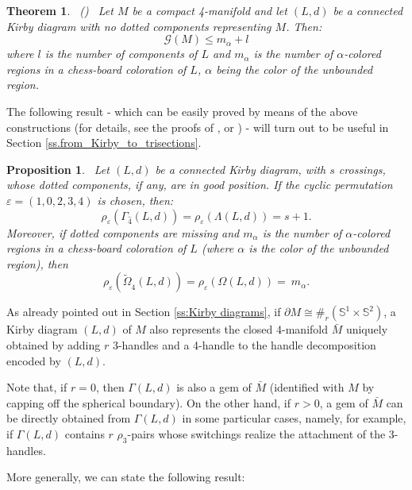 \documentclass[12pt,a4paper]{article}
\newtheorem{theorem}[lemma]{Theorem}
\newtheorem{proposition}[lemma]{Proposition}
\newcommand{\G}{\Gamma}
\begin{document}
\begin{theorem} \ {\rm (\cite{Casali-Cristofori Kirby-diagrams})} \  \label{regular-genus&gem-complexity(framed)} 
Let $M$ be a compact 4-manifold and let $(L,d)$ be a connected Kirby diagram  with no dotted components representing $M$. Then:
$$\mathcal G(M)\leq m_{\alpha} + l$$
\noindent where $l$ is the number of components of $L$ and $m_\alpha$ is the number of $\alpha$-colored regions in a chess-board coloration of $L$, $\alpha$ being the color of the unbounded region.
\end{theorem}

The following result - which can be easily proved by means of the above constructions (for details, see the proofs of \cite[Theorem 1]{Casali JKTR2000}, \cite[Theorem 7]{Casali-Cristofori Kirby-diagrams} or \cite[Theorem 3]{Casali-Cristofori gem-induced}) - will turn out to be useful in Section \ref{ss.from_Kirby_to_trisections}. 

\begin{proposition}\label{order-regular genus Gamma}\ Let $(L,d)$ be a connected Kirby diagram, with $s$ crossings, whose dotted components, if any, are in good position. If the cyclic permutation $\varepsilon = (1,0,2,3,4)$ is chosen, then:
$$\rho_{\varepsilon}(\G_{\hat 4}(L,d))=\rho_{\varepsilon}(\Lambda(L,d)) = s + 1.$$
\smallskip
Moreover, if dotted components are missing and $m_\alpha$ is the number of $\alpha$-colored regions in a chess-board coloration of $L$ (where $\alpha$ is the color of the unbounded region), then $$\rho_{\varepsilon}(\tilde\Omega_{\hat 4}(L,d))=\rho_{\varepsilon}(\Omega(L,d)) = \  m_\alpha.$$
\end{proposition}

\bigskip
\bigskip

As already pointed out in Section \ref{ss:Kirby diagrams}, if $\partial M\cong\#_r(\mathbb S^1\times\mathbb S^2)$, a Kirby diagram $(L,d)$ of $M$ also represents the closed 4-manifold $\bar M$ uniquely obtained by adding $r$ 3-handles and a 4-handle to the handle decomposition encoded by $(L,d)$. 

Note that, if $r=0$, then $\G(L,d)$ is also a gem of $\bar M$ (identified with $M$ by capping off the spherical boundary). On the other hand, if $r>0$, a gem of $\bar M$ can be directly obtained from $\G(L,d)$ in some particular cases, namely, for example, if $\G(L,d)$ contains $r$ \! $\rho_3$-pairs whose switchings realize the attachment of the 3-handles. 

More generally, we can state the following result:
\end{document}
